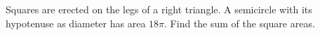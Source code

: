 Squares are erected on the legs of a right triangle. A semicircle with its hypotenuse as diameter has area $18\pi$. Find the sum of the square areas.
